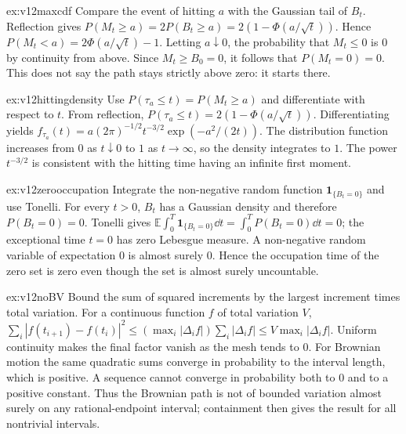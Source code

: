 \begin{solution}{ex:v12maxcdf}
\idea Compare the event of hitting $a$ with the Gaussian tail of $B_t$.
\writeup Reflection gives $P(M_t\ge a)=2P(B_t\ge a)=2(1-\Phi(a/\sqrt t))$. Hence $P(M_t<a)=2\Phi(a/\sqrt t)-1$. Letting $a\downarrow0$, the probability that $M_t\le0$ is $0$ by continuity from above. Since $M_t\ge B_0=0$, it follows that $P(M_t=0)=0$. This does not say the path stays strictly above zero: it starts there.
\end{solution}

\begin{solution}{ex:v12hittingdensity}
\idea Use $P(\tau_a\le t)=P(M_t\ge a)$ and differentiate with respect to $t$.
\writeup From reflection, $P(\tau_a\le t)=2(1-\Phi(a/\sqrt t))$. Differentiating yields $f_{\tau_a}(t)=a(2\pi)^{-1/2}t^{-3/2}\exp(-a^2/(2t))$. The distribution function increases from $0$ as $t\downarrow0$ to $1$ as $t\to\infty$, so the density integrates to $1$. The power $t^{-3/2}$ is consistent with the hitting time having an infinite first moment.
\end{solution}

\begin{solution}{ex:v12zerooccupation}
\idea Integrate the non-negative random function $\mathbf1_{\{B_t=0\}}$ and use Tonelli.
\writeup For every $t>0$, $B_t$ has a Gaussian density and therefore $P(B_t=0)=0$. Tonelli gives $\mathbb E\int_0^T\mathbf1_{\{B_t=0\}}\dd t=\int_0^TP(B_t=0)\dd t=0$; the exceptional time $t=0$ has zero Lebesgue measure. A non-negative random variable of expectation $0$ is almost surely $0$. Hence the occupation time of the zero set is zero even though the set is almost surely uncountable.
\end{solution}

\begin{solution}{ex:v12noBV}
\idea Bound the sum of squared increments by the largest increment times total variation.
\writeup For a continuous function $f$ of total variation $V$, $\sum_i|f(t_{i+1})-f(t_i)|^2\le(\max_i|\Delta_i f|)\sum_i|\Delta_i f|\le V\max_i|\Delta_i f|$. Uniform continuity makes the final factor vanish as the mesh tends to $0$. For Brownian motion the same quadratic sums converge in probability to the interval length, which is positive. A sequence cannot converge in probability both to $0$ and to a positive constant. Thus the Brownian path is not of bounded variation almost surely on any rational-endpoint interval; containment then gives the result for all nontrivial intervals.
\end{solution}

